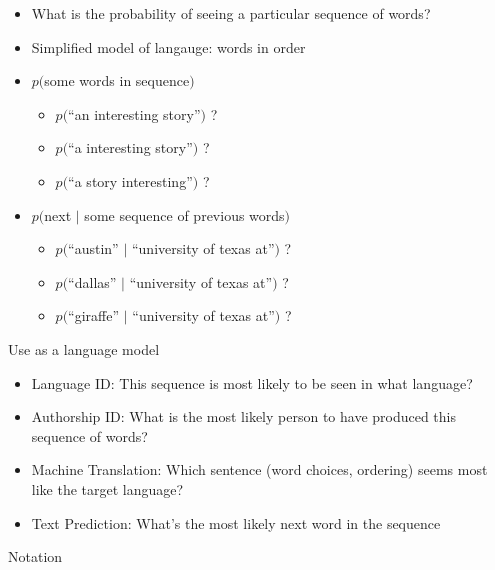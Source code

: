 \documentclass[11pt,letterpaper]{article}
\begin{document}
\begin{itemize}
  \item What is the probability of seeing a particular sequence of words?
  \item Simplified model of langauge: words in order
  \item $p($some words in sequence$)$
    \begin{itemize}
      \item $p($``an interesting story''$)$ ?
      \item $p($``a interesting story''$)$ ?
      \item $p($``a story interesting''$)$ ?
    \end{itemize}
  \item $p($next $\mid$ some sequence of previous words$)$
    \begin{itemize}
      \item $p($``austin'' $\mid$ ``university of texas at''$)$ ?
      \item $p($``dallas'' $\mid$ ``university of texas at''$)$ ?
      \item $p($``giraffe'' $\mid$ ``university of texas at''$)$ ?
    \end{itemize}
\end{itemize}

Use as a language model

\begin{itemize}
  \item Language ID: This sequence is most likely to be seen in what language?
  \item Authorship ID: What is the most likely person to have produced this sequence of words?
  \item Machine Translation: Which sentence (word choices, ordering) seems most like the target language?
  \item Text Prediction: What's the most likely next word in the sequence
\end{itemize}

Notation
\end{document}
